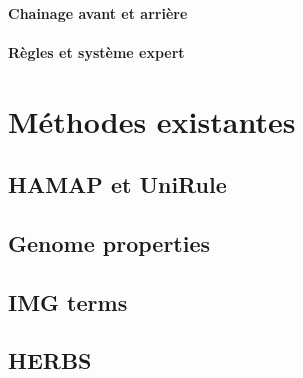 \begin{refsection}
    \paragraph{Chainage avant et arrière} %
    \paragraph{Règles et système expert}
    
    \section{Méthodes existantes}
    \subsection{HAMAP et UniRule}
    \subsection{Genome properties}
    \subsection{IMG terms}
    \subsection{HERBS}
    
    \subbibliography
\end{refsection}